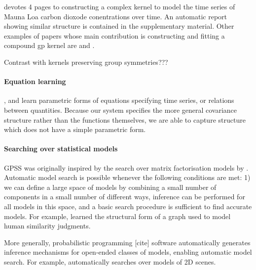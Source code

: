 \documentclass{article}
\def\eg{e.g.\ }
\begin{document}
\cite{rasmussen38gaussian} devotes 4 pages to constructing a complex kernel to model the time series of Mauna Loa carbon dioxode conentrations over time.  An automatic report showing similar structure is contained in the supplementary material.  Other examples of papers whose main contribution is constructing and fitting a compound gp{} kernel are \cite{klenske2012nonparametric} and \cite{lloydgefcom2012}.

Contrast with kernels preserving group symmetries???

\paragraph{Equation learning}

\cite{schmidt2009distilling}, \cite{todorovski1997declarative} and \cite{washio1999discovering} learn parametric forms of equations specifying time series, or relations between quantities.  Because our system specifies the more general covariance structure rather than the functions themselves, we are able to capture structure which does not have a simple parametric form.

\paragraph{Searching over statistical models}

GPSS was originally inspired by the search over matrix factorisation models by \cite{grosse2012exploiting}.
Automatic model search is possible whenever the following conditions are met: 1) we can define a large space of models by combining a small number of components in a small number of different ways, inference can be performed for all models in this space, and a basic search procedure is sufficient to find accurate models.  For example, \citet{kemp2008discovery} learned the structural form of a graph used to model human similarity judgments.  

More generally, probabilistic programming [cite] software automatically generates inference mechanisms for open-ended classes of models, enabling automatic model search.  For example, \cite{VikashScene13} automatically searches over models of 2D scenes.
\end{document}
